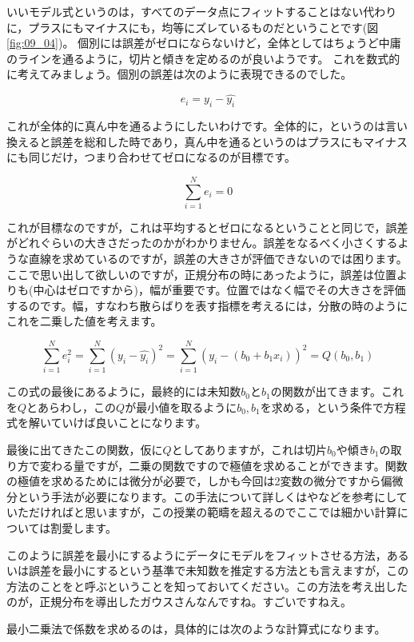 \documentclass{ltjbook}
\begin{document}
いいモデル式というのは，すべてのデータ点にフィットすることはない代わりに，プラスにもマイナスにも，均等にズレているものだということです(図\ref{fig:09_04})。
個別には誤差がゼロにならないけど，全体としてはちょうど中庸のラインを通るように，切片と傾きを定めるのが良いようです。
これを数式的に考えてみましょう。個別の誤差は次のように表現できるのでした。

\[e_i = y_i - \hat{y_i} \]

これが全体的に真ん中を通るようにしたいわけです。全体的に，というのは言い換えると誤差を総和した時であり，真ん中を通るというのはプラスにもマイナスにも同じだけ，つまり合わせてゼロになるのが目標です。

\[\sum_{i=1}^N e_i = 0 \]

これが目標なのですが，これは平均するとゼロになるということと同じで，誤差がどれぐらいの大きさだったのかがわかりません。誤差をなるべく小さくするような直線を求めているのですが，誤差の大きさが評価できないのでは困ります。
ここで思い出して欲しいのですが，正規分布の時にあったように，誤差は位置よりも(中心はゼロですから)，幅が重要です。位置ではなく幅でその大きさを評価するのです。幅，すなわち散らばりを表す指標を考えるには，分散の時のようにこれを二乗した値を考えます。

\[\sum_{i=1}^N e_i^2=\sum_{i=1}^N (y_i - \hat{y_i})^2 = \sum_{i=1}^N (y_i - (b_0 + b_1x_i))^2=Q(b_0,b_1) \]

この式の最後にあるように，最終的には未知数$b_0$と$b_1$の関数が出てきます。これを$Q$とあらわし，この$Q$が最小値を取るように$b_0,b_1$を求める，という条件で方程式を解いていけば良いことになります。

最後に出てきたこの関数，仮に$Q$としてありますが，これは切片$b_0$や傾き$b_1$の取り方で変わる量ですが，二乗の関数ですので極値を求めることができます。関数の極値を求めるためには微分が必要で，しかも今回は2変数の微分ですから偏微分という手法が必要になります。この手法について詳しくは\textcite{kosugi2018}や\textcite{Nishiuchi201712}などを参考にしていただければと思いますが，この授業の範疇を超えるのでここでは細かい計算については割愛します。

このように誤差を最小にするようにデータにモデルをフィットさせる方法，あるいは誤差を最小にするという基準で未知数を推定する方法とも言えますが，この方法のことをと呼ぶということを知っておいてください。この方法を考え出したのが，正規分布を導出したガウスさんなんですね。すごいですねえ。

最小二乗法で係数を求めるのは，具体的には次のような計算式になります。
\end{document}
